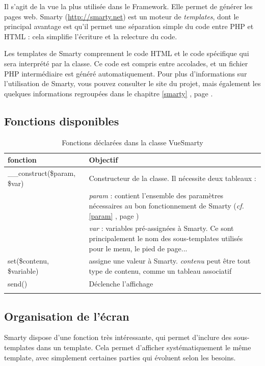 Il s'agit de la vue la plus utilisée dans le Framework. Elle permet de générer les pages web. Smarty (\url{http://smarty.net}) est un moteur de \textit{templates}, dont le principal avantage est qu'il permet une séparation simple du code entre PHP et HTML : cela simplifie l'écriture et la relecture du code.

Les templates de Smarty comprennent le code HTML et le code spécifique qui sera interprété par la classe. Ce code est compris entre accolades, et un fichier PHP intermédiaire est généré automatiquement. Pour plus d'informations sur l'utilisation de Smarty, vous pouvez consulter le site du projet, mais également les quelques informations regroupées dans le chapitre \ref{smarty} \textit{}, page \pageref{smarty}.

\subsection{Fonctions disponibles}
\begin{longtable}{|p{5cm}|p{8cm}|}
\hline
\textbf{fonction} & \textbf{Objectif} \\
\hline
\endhead
\hline\endfoot\endlastfoot
\_\_construct(\$param, \$var) & Constructeur de la classe. Il nécessite deux tableaux : \\
 & \textit{param} : contient l'ensemble des paramètres nécessaires au bon fonctionnement de Smarty (\textit{cf.} \ref{param} \textit{\nameref{param}}, page \pageref{param})\\
 & \textit{var} : variables pré-assignées à Smarty. Ce sont principalement le nom des sous-templates utilisés pour le menu, le pied de page...\\

 set(\$contenu, \$variable) & assigne une valeur à Smarty. \textit{contenu} peut être tout type de contenu, comme un tableau associatif \\

 send() & Déclenche l'affichage \\
\hline
\caption{Fonctions déclarées dans la classe VueSmarty}
\end{longtable}


\subsection{Organisation de l'écran}
Smarty dispose d'une fonction très intéressante, qui permet d'inclure des sous-templates dans un template. Cela permet d'afficher systématiquement le même template, avec simplement certaines parties qui évoluent selon les besoins.

